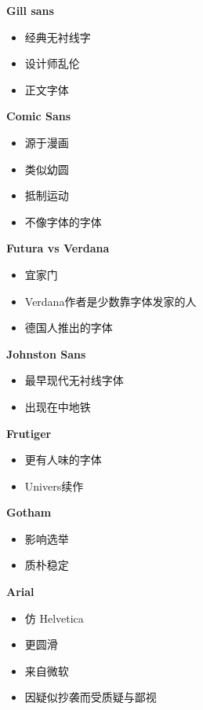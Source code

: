 \documentclass[
  letterpaper,
  DIV=11,
  numbers=noendperiod]{scrreprt}
\providecommand{\tightlist}{%
  \setlength{\itemsep}{0pt}\setlength{\parskip}{0pt}}\usepackage{longtable,booktabs,array}
\begin{document}
\textbf{Gill sans}

\begin{itemize}
\tightlist
\item
  经典无衬线字
\item
  设计师乱伦
\item
  正文字体
\end{itemize}

\textbf{Comic Sans}

\begin{itemize}
\tightlist
\item
  源于漫画
\item
  类似幼圆
\item
  抵制运动
\item
  不像字体的字体
\end{itemize}

\textbf{Futura vs Verdana}

\begin{itemize}
\tightlist
\item
  宜家门
\item
  Verdana作者是少数靠字体发家的人
\item
  德国人推出的字体
\end{itemize}

\textbf{Johnston Sans}

\begin{itemize}
\tightlist
\item
  最早现代无衬线字体
\item
  出现在中地铁
\end{itemize}

\textbf{Frutiger}

\begin{itemize}
\tightlist
\item
  更有人味的字体
\item
  Univers续作
\end{itemize}

\textbf{Gotham}

\begin{itemize}
\tightlist
\item
  影响选举
\item
  质朴稳定
\end{itemize}

\textbf{Arial}

\begin{itemize}
\tightlist
\item
  仿 Helvetica
\item
  更圆滑
\item
  来自微软
\item
  因疑似抄袭而受质疑与鄙视
\end{itemize}
\end{document}
